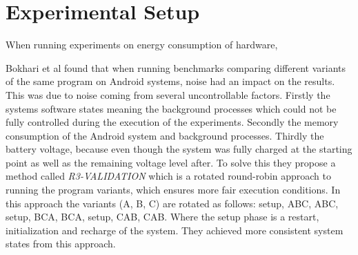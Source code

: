 
\section{Experimental Setup}

When running experiments on energy consumption of hardware, 


Bokhari et al\cite{Bokhari2020r3} found that when running benchmarks comparing different variants of the same program on Android systems, noise had an impact on the results. This was due to noise coming from several uncontrollable factors. Firstly the systems software states meaning the background processes which could not be fully controlled during the execution of the experiments. Secondly the memory consumption of the Android system and background processes. Thirdly the battery voltage, because even though the system was fully charged at the starting point as well as the remaining voltage level after. To solve this they propose a method called \textit{R3-VALIDATION} which is a rotated round-robin approach to running the program variants, which ensures more fair execution conditions. In this approach the variants (A, B, C) are rotated as follows: setup, ABC, ABC, setup, BCA, BCA, setup, CAB, CAB. Where the setup phase is a restart, initialization and recharge of the system. They achieved more consistent system states from this approach.